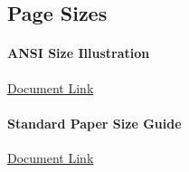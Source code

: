 
\subsection{Page Sizes}
\paragraph{ANSI Size Illustration}
\href{../../documentation/readingRoom/printingResources/ANSI_size_illustration.pdf}{Document Link}
\paragraph{Standard Paper Size Guide}
\href{../../documentation/readingRoom/printingResources/StandardPaperSizeGuide.pdf}{Document Link}

